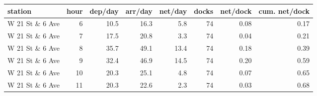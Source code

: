 \begin{tabular}{lrrrrrrr}
\toprule
\textbf{station} & \textbf{hour} & \textbf{dep/day} & \textbf{arr/day} & \textbf{net/day} & \textbf{docks} & \textbf{net/dock} & \textbf{cum. net/dock} \\
\midrule
W 21 St \& 6 Ave & 6 & 10.5 & 16.3 & 5.8 & 74 & 0.08 & 0.17 \\
W 21 St \& 6 Ave & 7 & 17.5 & 20.8 & 3.3 & 74 & 0.04 & 0.21 \\
W 21 St \& 6 Ave & 8 & 35.7 & 49.1 & 13.4 & 74 & 0.18 & 0.39 \\
W 21 St \& 6 Ave & 9 & 32.4 & 46.9 & 14.5 & 74 & 0.20 & 0.59 \\
W 21 St \& 6 Ave & 10 & 20.3 & 25.1 & 4.8 & 74 & 0.07 & 0.65 \\
W 21 St \& 6 Ave & 11 & 20.3 & 22.6 & 2.3 & 74 & 0.03 & 0.68 \\
\bottomrule
\end{tabular}
